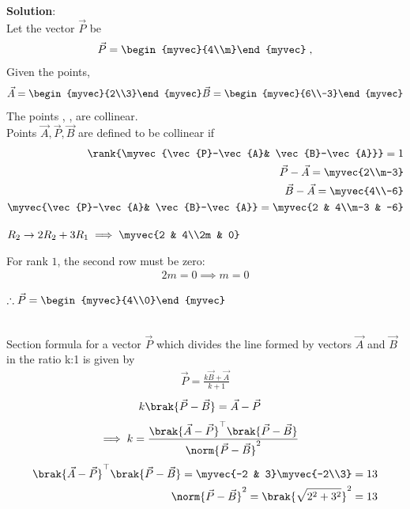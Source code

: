 \documentclass[journal]{IEEEtran}
\begin{document}
\textbf{Solution}:\\
Let the vector $\vec{P}$ be 
\begin{align}
    \vec{P}=\begin{myvec}{4\\m}\end{myvec} \;, 
\end{align}
Given the points,
\begin{align}
    \vec{A}=\begin{myvec}{2\\3}\end{myvec}
    \vec{B}=\begin{myvec}{6\\-3}\end{myvec}
\end{align}
\bigskip
The points , ,  are collinear.\\
Points $\vec{A}, \vec{P}, \vec{B}$ are defined to be collinear if 
		\begin{align}
			\label{eq:line-rank-2}
			\rank{\myvec{\vec{P}-\vec{A}& \vec{B}-\vec{A}}} = 1\\
            \vec{P}-\vec{A} = \myvec{2\\m-3}\\
            \vec{B}-\vec{A} = \myvec{4\\-6}\\
            \myvec{\vec{P}-\vec{A}& \vec{B}-\vec{A}} = \myvec{2 & 4\\m-3 & -6}
		\end{align}
\begin{center}
$R_2 \rightarrow 2R_2 + 3R_1 \implies \myvec{2 & 4\\2m & 0}$
\end{center}
For rank $1$, the second row must be zero:
\begin{align}
    2m=0 \implies m=0
\end{align}
\begin{center}
$\therefore \vec{P}=\begin{myvec}{4\\0}\end{myvec}$
\end{center}
\\
Section formula for a vector $\vec{P}$ which divides the line formed by vectors $\vec{A}$ and $\vec{B}$ in the ratio k:1 is given by
\begin{align}
    \vec{P}=\frac{k\vec{B}+\vec{A}}{k+1}
\end{align}
\begin{align}
			k\brak{\vec{P}-\vec{B}}&= \vec{A}-\vec{P}
\end{align}
\begin{align}
    \implies k &=
			\frac{\brak{\vec{A}-\vec{P}}^{\top}\brak{\vec{P}-\vec{B}}}{\norm{\vec{P}-\vec{B}}^2}
			\label{eq:section_formula-k}
\end{align}
\bigskip
\begin{align}
\brak{\vec{A}-\vec{P}}^{\top}\brak{\vec{P}-\vec{B}} = \myvec{-2 & 3}\myvec{-2\\3} = 13\\
{\norm{\vec{P}-\vec{B}}^2} = \brak{\sqrt{2^2 + 3^2}}^2 = 13
\end{align}
\end{document}
